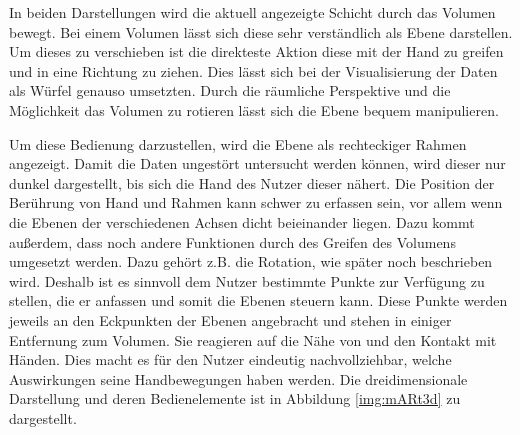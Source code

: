 In beiden Darstellungen wird die aktuell angezeigte Schicht durch das Volumen bewegt. Bei einem Volumen lässt sich diese sehr verständlich als Ebene darstellen. Um dieses zu verschieben ist die direkteste Aktion diese mit der Hand zu greifen und in eine Richtung zu ziehen. 
Dies lässt sich bei der Visualisierung der Daten als Würfel genauso umsetzten. Durch die räumliche Perspektive und die Möglichkeit das Volumen zu rotieren lässt sich die Ebene bequem manipulieren. 

Um diese Bedienung darzustellen, wird die Ebene als rechteckiger Rahmen angezeigt. Damit die Daten ungestört untersucht werden können, wird dieser nur dunkel dargestellt, bis sich die Hand des Nutzer dieser nähert. 
Die Position der Berührung von Hand und Rahmen kann schwer zu erfassen sein, vor allem wenn die Ebenen der verschiedenen Achsen dicht beieinander liegen. Dazu kommt außerdem, dass noch andere Funktionen durch des Greifen des Volumens umgesetzt werden. Dazu gehört z.B. die Rotation, wie später noch beschrieben wird. Deshalb ist es sinnvoll dem Nutzer bestimmte Punkte zur Verfügung zu stellen, die er anfassen und somit die Ebenen steuern kann. Diese Punkte werden jeweils an den Eckpunkten der Ebenen angebracht und stehen in einiger Entfernung zum Volumen. Sie reagieren auf die Nähe von und den Kontakt mit Händen. Dies macht es für den Nutzer eindeutig nachvollziehbar, welche Auswirkungen seine Handbewegungen haben werden. 
Die dreidimensionale Darstellung und deren Bedienelemente ist in Abbildung \ref{img:mARt3d} zu dargestellt.

